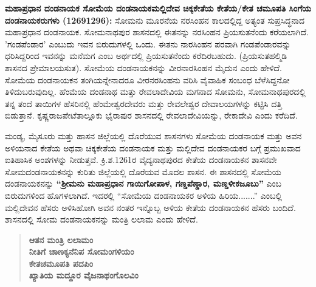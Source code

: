 \textbf{ಮಹಾಪ್ರಧಾನ ದಂಡನಾಯಕ ಸೋಮೆಯ ದಂಡನಾಯಕ\general{\enginline{-}}ಮಲ್ಲಿದೇವ  ಚಿಕ್ಕಕೇತೆಯ \general{\enginline{-}}ಕೇತೆಯ/ಕೇತ ಚಮೂಪತಿ  ಸಿಂಗೆಯ ದಂಡನಾಯಕರುಗಳು (1269\general{\enginline{-}}1296):} ಸೋಮನು ಮೂರನೆಯ ನರಸಿಂಹನ ಕಾಲದಲ್ಲಿದ್ದ ಅತ್ಯಂತ ಸುಪ್ರಸಿದ್ಧನಾದ ಮಹಾಪ್ರಧಾನ ದಂಡನಾಯಕ. ಸೋಮನಾಥಪುರ ಶಾಸನದಲ್ಲಿ ಈತನನ್ನು ನರಸಿಂಹನ ಪ್ರಿಯಸುತನೆಂದು ಕರೆಯಲಾಗಿದೆ. 'ಗಂಡಪೆಂಡಾರ' ಎಂಬುದು ಇವನ ಬಿರುದುಗಳಲ್ಲಿ ಒಂದು. ಈತನು ನಾರಸಿಂಹನ ಪರವಾಗಿ ಗಂಡಪೆಂಡಾರವನ್ನು ಧರಿಸಿದ್ದರಿಂದ ಇವನನ್ನು ಮನೆಮಗ ಎಂಬ ಅರ್ಥದಲ್ಲಿ ಪ್ರಿಯಸುತನೆಂದು ಕರೆದಿರಬಹುದು. (ಪ್ರಿಯಸುತ\enginline{-}ಹಲ್ಮಿಡಿ ಶಾಸನದ ಪ್ರೇಮಾಲಯಸುತ). ಸೋಮೆಯ ದಂಡನಾಯಕನನ್ನು ವೀರನಾರಸಿಂಹನ ಮೈದುನ ಎಂದು ಹೇಳಿದೆ. ಸೋಮೆಯ ದಂಡನಾಯಕನ ತಂಗಿಯನ್ನೇನಾ\-ದರೂ ವೀರನರಸಿಂಹನು ವರಿಸಿ ವೈವಾಹಿಕ ಸಂಬಂಧ ಬೆಳೆಸಿದ್ದನೋ ತಿಳಿದುಬರುವುದಿಲ್ಲ. ಹೆಂಮೆಯ ದಂಡನಾಥ ಮತ್ತು ರೇವಲಾದೇವಿಯ ಮಗನಾದ ಸೋಮನು, ಸೋಮನಾಥಪುರದಲ್ಲಿ ತನ್ನ ತಂದೆ ತಾಯಿಗಳ ಹೆಸರಿನಲ್ಲಿ ಹೆಂಮೇಶ್ವರದೇವರು ಮತ್ತು ರೇವಲೇಶ್ವರ ದೇವಾಲಯಗಳನ್ನು ಕಟ್ಟಿಸಿ ದತ್ತಿ ಬಿಡುತ್ತಾನೆ. ಕೃಷ್ಣರಾಜಪೇಟೆ\break ತಾಲ್ಲೂಕು ಭೈರಾಪುರ ಶಾಸನದಲ್ಲಿ ರೇವಲಾದೇವಿಯನ್ನು, ರೇಕಾದೇವಿ ಎಂದು ಕರೆದಿದೆ.

\newpage

ಮಂಡ್ಯ, ಮೈಸೂರು ಮತ್ತು ಹಾಸನ ಜಿಲ್ಲೆಯಲ್ಲಿ ದೊರೆಯುವ ಶಾಸನಗಳು ಸೋಮೆಯ ದಂಡನಾಯಕ ಮತ್ತು ಅವನ ಅಳಿಯನಾದ ಕೇತೆಯ ಅಥವಾ ಚಿಕ್ಕಕೇತೆಯ ದಂಡನಾಯಕ ಮತ್ತು ಮಲ್ಲಿದೇವ ದಂಡನಾಯಕರ ಬಗ್ಗೆ ಪ್ರಮುಖವಾದ ಐತಿಹಾಸಿಕ ಅಂಶಗಳನ್ನು ನೀಡುತ್ತವೆ. ಕ್ರಿ.ಶ.1261ರ ವೈದ್ಯನಾಥಪುರದ ಕೇತೆಯ ದಂಡನಾಯಕನ ಶಾಸನವೇ ಸೋಮದಂಡನಾಯಕನನ್ನು ಕುರಿತು ಜಿಲ್ಲೆಯಲ್ಲಿ ದೊರೆಯವ ಮೊದಲ ಶಾಸನ. ಈ ಶಾಸನದಲ್ಲಿ ಸೋಮೆಯ ದಂಡನಾಯಕನನ್ನು \textbf{“ಶ‍್ರೀಮನು ಮಹಾಪ್ರಧಾನ ಗಾಯಿಗೋಪಾಳ, ಗಣ್ಡಪೆಣ್ಡಾರ, ಮಣ್ಡಳೀಕಜೂಬು”} ಎಂಬ ಬಿರುದುಗಳಿಂದ ಹೊಗಳಲಾಗಿದೆ. ಇದರಲ್ಲಿ “ಸೋಮೆಯ ದಂಡನಾಯಕರ ಅಳಿಯ ಹಿರಿಯ.......” ಎಂಬಲ್ಲಿ ಮಲ್ಲಿದೇವನ ಹೆಸರು ಅಳಿಸಿಹೋಗಿ ಅವನ ನಂತರ ಇನ್ನೊಬ್ಬ ಅಳಿಯ ಕೇತೆಯ ದಂಡನಾಯಕನ ಹೆಸರು ಬಂದಿದೆ. ಶಾಸನದಲ್ಲಿ ಸೋಮ ದಂಡನಾಯಕನನ್ನು ಮಂತ್ರಿ ಲಲಾಮ ಎಂದು ಹೇಳಿದೆ.

\vskip 2pt

\begin{verse}
\textbf{ಆತನ ಮಂತ್ರಿ ಲಲಾಮಂ} \\\textbf{ನೀತಿಗೆ ಚಾಣಕ್ಯನೆನಿಪ ಸೋಮಂಗಳಿಯಂ } \\\textbf{ಕೇತಚಮೂಪತಿ ಪದಪಿಂ} \\\textbf{ಖ್ಯಾತಿಯ ಮದ್ದೂರ ವೈಜನಾಥಂಗೊಲವಿಂ}
\end{verse}

\vskip 2pt

